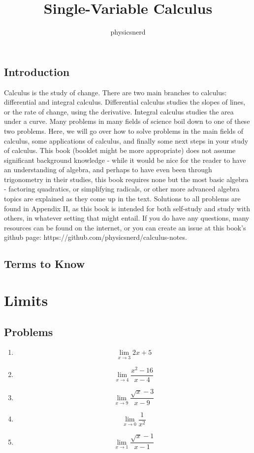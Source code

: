 \documentclass{book}
\title{Single-Variable Calculus}
\author{physicsnerd}
\begin{document}
\maketitle
\frontmatter
\tableofcontents
\chapter{Introduction}
Calculus is the study of change. 
There are two main branches to calculus: differential and integral calculus. 
Differential calculus studies the slopes of lines, or the rate of change, using the derivative. 
Integral calculus studies the area under a curve. 
Many problems in many fields of science boil down to one of these two problems. 
Here, we will go over how to solve problems in the main fields of calculus, some applications of calculus, and finally some next steps in your study of calculus.
This book (booklet might be more appropriate) does not assume significant background knowledge - while it would be nice for the reader to have an understanding of algebra, and perhaps to have even been through trigonometry in their studies, this book requires none but the most basic algebra - factoring quadratics, or simplifying radicals, or other more advanced algebra topics are explained as they come up in the text. 
Solutions to all problems are found in Appendix II, as this book is intended for both self-study and study with others, in whatever setting that might entail.
If you do have any questions, many resources can be found on the internet, or you can create an issue at this book's github page: https://github.com/physicsnerd/calculus-notes.

\mainmatter
\chapter{Terms to Know}



\part{Limits}



\chapter{Problems}
\begin{enumerate}
    \item $$\lim\limits_{x\rightarrow 3} 2x+5$$
    \item $$\lim\limits_{x\rightarrow 4} \frac{x^2-16}{x-4}$$
    \item $$\lim\limits_{x\rightarrow 9} \frac{\sqrt{x}-3}{x-9}$$
    \item $$\lim\limits_{x\rightarrow 0} \frac{1}{x^2}$$
    \item $$\lim\limits_{x\rightarrow 1} \frac{\sqrt{x}-1}{x-1}$$
\end{enumerate}
\end{document}
